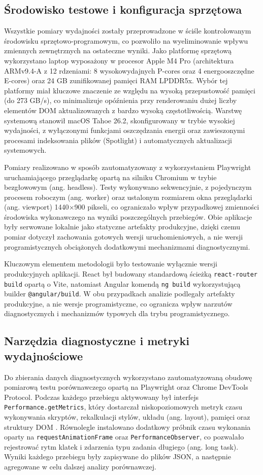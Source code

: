 \documentclass[12pt,openright,twoside]{report}
\begin{document}
\subsection{Środowisko testowe i konfiguracja sprzętowa}
Wszystkie pomiary wydajności zostały przeprowadzone w ściśle kontrolowanym środowisku sprzętowo-programowym, co pozwoliło na wyeliminowanie wpływu zmiennych zewnętrznych na ostateczne wyniki. Jako platformę sprzętową wykorzystano laptop wyposażony w procesor Apple M4 Pro (architektura ARMv9.4-A z 12 rdzeniami: 8 wysokowydajnych P-cores oraz 4 energooszczędne E-cores) oraz 24 GB zunifikowanej pamięci RAM LPDDR5x. Wybór tej platformy miał kluczowe znaczenie ze względu na wysoką przepustowość pamięci (do 273 GB/s), co minimalizuje opóźnienia przy renderowaniu dużej liczby elementów DOM aktualizowanych z bardzo wysoką częstotliwością. Warstwę systemową stanowił macOS Tahoe 26.2, skonfigurowany w trybie wysokiej wydajności, z wyłączonymi funkcjami oszczędzania energii oraz zawieszonymi procesami indeksowania plików (Spotlight) i automatycznych aktualizacji systemowych.

Pomiary realizowano w sposób zautomatyzowany z wykorzystaniem Playwright uruchamiającego przeglądarkę opartą na silniku Chromium w trybie bezgłowowym (ang. headless). Testy wykonywano sekwencyjnie, z pojedynczym procesem roboczym (ang. worker) oraz ustalonym rozmiarem okna przeglądarki (ang. viewport) 1440$\times$900 pikseli, co ograniczało wpływ przypadkowej zmienności środowiska wykonawczego na wyniki poszczególnych przebiegów. Obie aplikacje były serwowane lokalnie jako statyczne artefakty produkcyjne, dzięki czemu pomiar dotyczył zachowania gotowych wersji uruchomieniowych, a nie wersji programistycznych obciążonych dodatkowymi mechanizmami diagnostycznymi.

Kluczowym elementem metodologii było testowanie wyłącznie wersji produkcyjnych aplikacji. React był budowany standardową ścieżką \texttt{react-router build} opartą o Vite, natomiast Angular komendą \texttt{ng build} wykorzystującą builder \texttt{@angular/build}. W obu przypadkach analizie podlegały artefakty produkcyjne, a nie wersje programistyczne, co ogranicza wpływ narzutów diagnostycznych i mechanizmów typowych dla trybu programistycznego.

\subsection{Narzędzia diagnostyczne i metryki wydajnościowe}
Do zbierania danych diagnostycznych wykorzystano zautomatyzowaną obudowę pomiarową testu porównawczego opartą na Playwright oraz Chrome DevTools Protocol. Podczas każdego przebiegu aktywowany był interfejs \texttt{Performance.getMetrics}, który dostarczał niskopoziomowych metryk czasu wykonywania skryptów, rekalkulacji stylów, układu (ang. layout), pamięci oraz struktury DOM \cite{Chrome_Runtime_Performance}. Równolegle instalowano dodatkowy próbnik czasu wykonania oparty na \texttt{requestAnimationFrame} oraz \texttt{PerformanceObserver}, co pozwalało rejestrować rytm klatek i zdarzenia typu zadania długiego (ang. long task). Wyniki każdego przebiegu były zapisywane do plików JSON, a następnie agregowane w celu dalszej analizy porównawczej.
\end{document}
